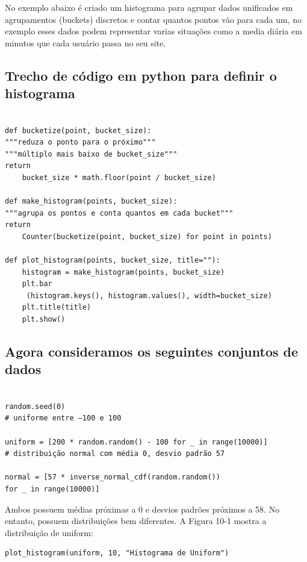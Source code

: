         No exemplo abaixo é criado um histograma para agrupar dados unificados em agrupamentos (buckets) discretos e contar quantos pontos vão para cada um, no exemplo esses dados podem representar varias situações como a media diária em minutos que cada usuário passa no seu site.

\subsection*{Trecho de código em python para definir o histograma}
\begin{lstlisting}

def bucketize(point, bucket_size):
"""reduza o ponto para o próximo""" 
"""múltiplo mais baixo de bucket_size"""
return 
    bucket_size * math.floor(point / bucket_size)

def make_histogram(points, bucket_size):
"""agrupa os pontos e conta quantos em cada bucket"""
return 
    Counter(bucketize(point, bucket_size) for point in points)

def plot_histogram(points, bucket_size, title=""):
    histogram = make_histogram(points, bucket_size)
    plt.bar
     (histogram.keys(), histogram.values(), width=bucket_size)
    plt.title(title)
    plt.show()

\end{lstlisting}

\newpage
\subsection*{Agora consideramos os seguintes conjuntos de dados}
\begin{lstlisting}

random.seed(0)
# uniforme entre –100 e 100

uniform = [200 * random.random() - 100 for _ in range(10000)]
# distribuição normal com média 0, desvio padrão 57

normal = [57 * inverse_normal_cdf(random.random())
for _ in range(10000)]

\end{lstlisting}

        Ambos possuem médias próximas a 0 e desvios padrões próximos a 58. No entanto, possuem distribuições bem diferentes. A Figura 10-1 mostra a distribuição de uniform:
        
\begin{lstlisting}
plot_histogram(uniform, 10, "Histograma de Uniform")
\end{lstlisting}
        
